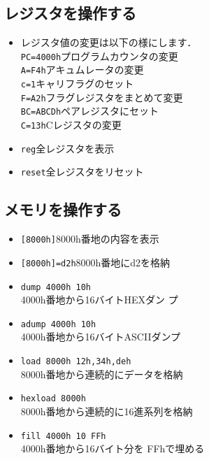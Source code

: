 \documentclass{jsarticle}
\begin{document}
\subsection{レジスタを操作する}
\begin{itemize}
\item レジスタ値の変更は以下の様にします．\\
   \verb|PC=4000h|\return\dotfill プログラムカウンタの変更\\
   \verb|A=F4h|\return\dotfill アキュムレータの変更\\
   \verb|c=1|\return \dotfill キャリフラグのセット\\   
   \verb|F=A2h|\return\dotfill フラグレジスタをまとめて変更\\
   \verb|BC=ABCDh|\return\dotfill ペアレジスタにセット\\
   \verb|C=13h|\return\dotfill Cレジスタの変更
\item \verb|reg|\return \dotfill 全レジスタを表示
\item \verb|reset|\return \dotfill 全レジスタをリセット
\end{itemize}
\subsection{メモリを操作する}
\begin{itemize}
\item \verb|[8000h]|\return \dotfill 8000h番地の内容を表示
\item \verb|[8000h]=d2h|\return \dotfill 8000h番地にd2を格納
\item \verb|dump 4000h 10h|\return \\\dotfill 4000h番地から16バイトHEXダン
      プ
\item \verb|adump 4000h 10h|\return \\\dotfill 4000h番地から16バイトASCIIダンプ
\item \verb|load 8000h 12h,34h,deh|\return \\\dotfill 8000h番地から連続的にデータを格納
\item \verb|hexload 8000h|\return \\
\dotfill 8000h番地から連続的に16進系列を格納
\item \verb|fill 4000h 10 FFh|\return\\ \dotfill 4000h番地から16バイト分を
      FFhで埋める
\end{itemize}
\end{document}
